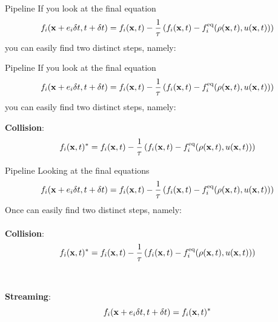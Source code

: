 \documentclass[9pt]{beamer}
\begin{document}
\begin{frame}[t]{Pipeline}
If you look at the final equation
\begin{equation*}
f_i({\bf x} + e_i \delta t, t + \delta t) = f_i({\bf x}, t) - \frac{1}{\tau}\left(f_i({\bf x}, t) - f_i^\text{eq}(\rho({\bf x}, t), u({\bf x}, t))\right)
\end{equation*}
you can easily find two distinct steps, namely:
\end{frame}

\begin{frame}[t]{Pipeline}
If you look at the final equation
\begin{equation*}
f_i({\bf x} + e_i \delta t, t + \delta t) = f_i({\bf x}, t) - \frac{1}{\tau}\left(f_i({\bf x}, t) - f_i^\text{eq}(\rho({\bf x}, t), u({\bf x}, t))\right)
\end{equation*}
you can easily find two distinct steps, namely:

\textbf{Collision}:
\begin{equation*}
f_i({\bf x}, t)^* = f_i({\bf x}, t) - \frac{1}{\tau}\left(f_i({\bf x}, t) - f_i^\text{eq}(\rho({\bf x}, t), u({\bf x}, t))\right)
\end{equation*}
\end{frame}

\begin{frame}[t]{Pipeline}
Looking at the final equations
\begin{equation*}
f_i({\bf x} + e_i \delta t, t + \delta t) = f_i({\bf x}, t) - \frac{1}{\tau}\left(f_i({\bf x}, t) - f_i^\text{eq}(\rho({\bf x}, t), u({\bf x}, t))\right)
\end{equation*}
Once can easily find two distinct steps, namely: \\~\\
\textbf{Collision}:
\begin{equation*}
f_i({\bf x}, t)^* = f_i({\bf x}, t) - \frac{1}{\tau}\left(f_i({\bf x}, t) - f_i^\text{eq}(\rho({\bf x}, t), u({\bf x}, t))\right)
\end{equation*}
\\~\\
\textbf{Streaming}:
\begin{equation*}
f_i({\bf x} + e_i \delta t, t + \delta t) = f_i({\bf x}, t)^*
\end{equation*}
\end{frame}
\end{document}
